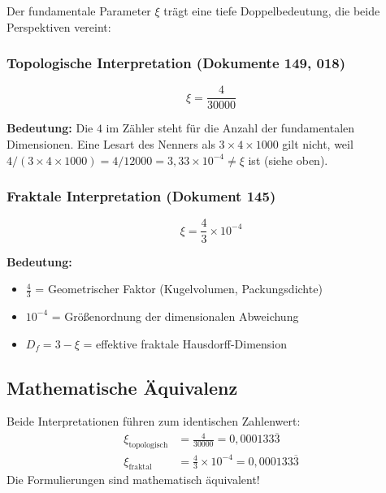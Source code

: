 	Der fundamentale Parameter $\xi$ trägt eine tiefe Doppelbedeutung, die beide Perspektiven vereint:
	
	\subsubsection{Topologische Interpretation (Dokumente 149, 018)}
	
	\begin{equation}
		\xi = \frac{4}{30000}
	\end{equation}
	
	\textbf{Bedeutung:} Die $4$ im Zähler steht für die Anzahl der fundamentalen Dimensionen. Eine Lesart des Nenners als $3 \times 4 \times 1000$ gilt nicht, weil $4/(3 \times 4 \times 1000) = 4/12000 = 3{,}33\times10^{-4} \neq \xi$ ist (siehe oben).
	
	\subsubsection{Fraktale Interpretation (Dokument 145)}
	
	\begin{equation}
		\xi = \frac{4}{3} \times 10^{-4}
	\end{equation}
	
	\textbf{Bedeutung:}
	\begin{itemize}
		\item $\frac{4}{3}$ = Geometrischer Faktor (Kugelvolumen, Packungsdichte)
		\item $10^{-4}$ = Größenordnung der dimensionalen Abweichung
		\item $D_f = 3 - \xi$ = effektive fraktale Hausdorff-Dimension
	\end{itemize}
	
	\subsection{Mathematische Äquivalenz}
	
	\begin{important}
		Beide Interpretationen führen zum identischen Zahlenwert:
		\begin{align}
			\xi_{\text{topologisch}} &= \frac{4}{30000} = 0{,}000133\overline{3} \\
			\xi_{\text{fraktal}} &= \frac{4}{3} \times 10^{-4} = 0{,}000133\overline{3}
		\end{align}
		Die Formulierungen sind mathematisch äquivalent!
	\end{important}
	

